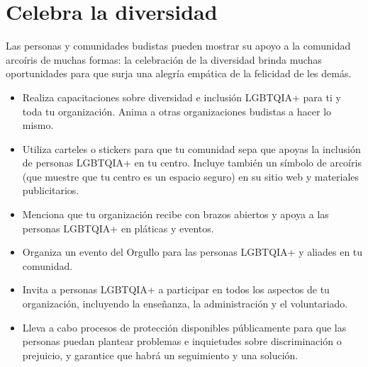 \documentclass[12pt,openany]{book}
\begin{document}
\section*{Celebra la diversidad}

Las personas y comunidades budistas pueden mostrar su apoyo a la comunidad arcoíris de muchas formas: la celebración de la diversidad brinda muchas oportunidades para que surja una alegría empática de la felicidad de les demás.

\begin{itemize}
  \setlength\itemsep{-0.3em}
  \item Realiza capacitaciones sobre diversidad e inclusión LGBTQIA+ para ti y toda tu organización. Anima a otras organizaciones budistas a hacer lo mismo.
  \item Utiliza carteles o stickers para que tu comunidad sepa que apoyas la inclusión de personas LGBTQIA+ en tu centro. Incluye también un símbolo de arcoíris (que muestre que tu centro es un espacio seguro) en su sitio web y materiales publicitarios.
  \item Menciona que tu organización recibe con brazos abiertos y apoya a las personas LGBTQIA+ en pláticas y eventos.
  \item Organiza un evento del Orgullo para las personas LGBTQIA+ y aliades en tu comunidad.
  \item Invita a personas LGBTQIA+ a participar en todos los aspectos de tu organización, incluyendo la enseñanza, la administración y el voluntariado.
  \item Lleva a cabo procesos de protección disponibles públicamente para que las personas puedan plantear problemas e inquietudes sobre discriminación o prejuicio, y garantice que habrá un seguimiento y una solución.
\end{itemize}
\begin{figure}[h]
    \centering
\end{figure}
\end{document}
